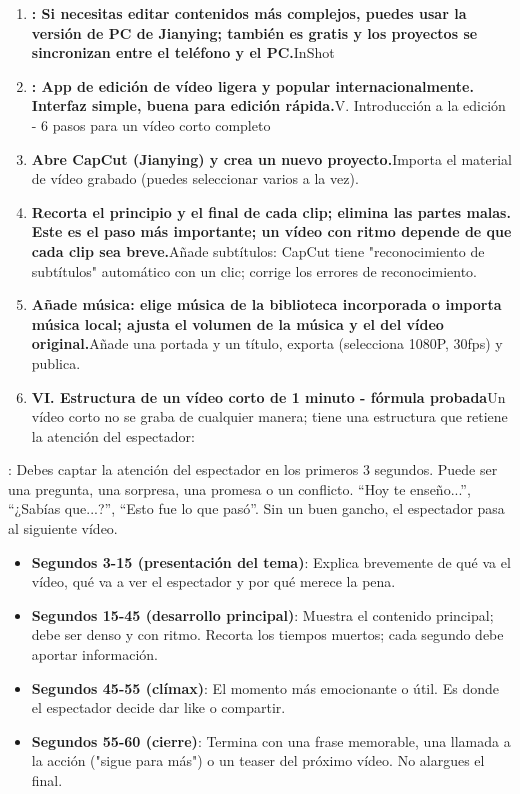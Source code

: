 \begin{enumerate}
  \item \textbf{: Si necesitas editar contenidos más complejos, puedes usar la versión de PC de Jianying; también es gratis y los proyectos se sincronizan entre el teléfono y el PC.}InShot
  \item \textbf{: App de edición de vídeo ligera y popular internacionalmente. Interfaz simple, buena para edición rápida.}V. Introducción a la edición - 6 pasos para un vídeo corto completo
  \item \textbf{Abre CapCut (Jianying) y crea un nuevo proyecto.}Importa el material de vídeo grabado (puedes seleccionar varios a la vez).
  \item \textbf{Recorta el principio y el final de cada clip; elimina las partes malas. Este es el paso más importante; un vídeo con ritmo depende de que cada clip sea breve.}Añade subtítulos: CapCut tiene "reconocimiento de subtítulos" automático con un clic; corrige los errores de reconocimiento.
  \item \textbf{Añade música: elige música de la biblioteca incorporada o importa música local; ajusta el volumen de la música y el del vídeo original.}Añade una portada y un título, exporta (selecciona 1080P, 30fps) y publica.
  \item \textbf{VI. Estructura de un vídeo corto de 1 minuto - fórmula probada}Un vídeo corto no se graba de cualquier manera; tiene una estructura que retiene la atención del espectador:
\end{enumerate}


: Debes captar la atención del espectador en los primeros 3 segundos. Puede ser una pregunta, una sorpresa, una promesa o un conflicto. “Hoy te enseño...”, “¿Sabías que...?”, “Esto fue lo que pasó”. Sin un buen gancho, el espectador pasa al siguiente vídeo.

\begin{itemize}
  \item \textbf{Segundos 3-15 (presentación del tema)}: Explica brevemente de qué va el vídeo, qué va a ver el espectador y por qué merece la pena.
  \item \textbf{Segundos 15-45 (desarrollo principal)}: Muestra el contenido principal; debe ser denso y con ritmo. Recorta los tiempos muertos; cada segundo debe aportar información.
  \item \textbf{Segundos 45-55 (clímax)}: El momento más emocionante o útil. Es donde el espectador decide dar like o compartir.
  \item \textbf{Segundos 55-60 (cierre)}: Termina con una frase memorable, una llamada a la acción ("sigue para más") o un teaser del próximo vídeo. No alargues el final.
\end{itemize}

